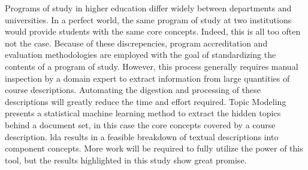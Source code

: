 Programs of study in higher education differ widely between departments and
universities. In a perfect world, the same program of study at two
institutions would provide students with the same core concepts. Indeed,
this is all too often not the case. Because of these discrepencies, program
accreditation and evaluation methodologies are employed with the goal of
standardizing the contents of a program of study. However, this process
generally requires manual inspection by a domain expert to extract
information from large quantities of course descriptions. Automating the
digestion and processing of these descriptions will greatly reduce the time and
effort required. Topic Modeling presents a statistical machine learning
method to extract the hidden topics behind a document set, in this case the
core concepts covered by a course description. \acf{lda} results in a feasible
breakdown of textual descriptions into component concepts. More work will be
required to fully utilize the power of this tool, but the results
highlighted in this study show great promise.
